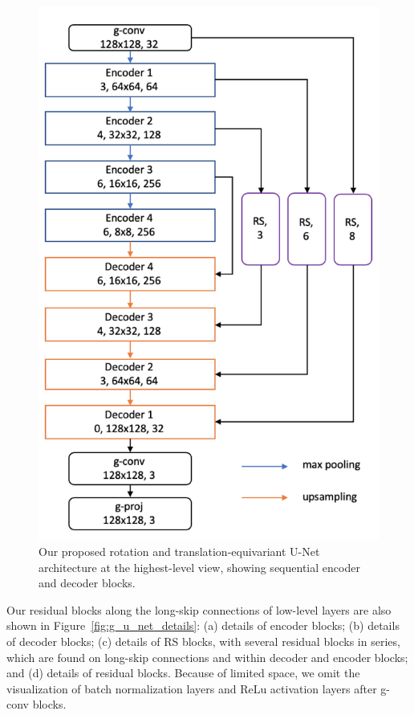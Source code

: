 \begin{figure}[thb]
    \centering
    \includegraphics[scale=0.95]{resources/4_UNet_Architecture-part1.png}
    \caption{Our proposed rotation and translation-equivariant U-Net architecture at the 
    highest-level view, showing sequential encoder and decoder blocks.}
    \label{fig:g_u_net}
\end{figure}

Our residual blocks along the long-skip connections of low-level layers are also shown in Figure~\ref{fig:g_u_net_details}: (a) details of encoder blocks; (b) details of decoder blocks;     (c) details of RS blocks, with several residual blocks in series, which are found on long-skip connections and within decoder and encoder blocks; and (d) details of residual blocks. Because of limited space, we omit the visualization of batch normalization layers and ReLu activation layers after g-conv blocks. 

